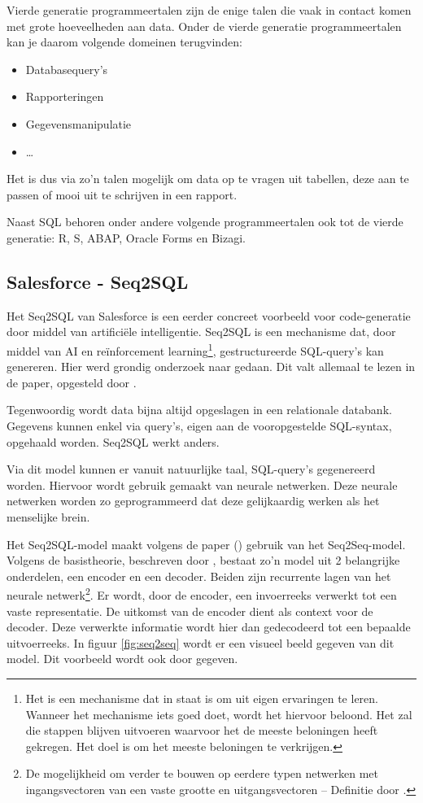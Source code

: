 Vierde generatie programmeertalen zijn de enige talen die vaak in contact komen met grote hoeveelheden aan data. Onder de vierde generatie programmeertalen kan je daarom volgende domeinen terugvinden:
\begin{itemize}
	\item Databasequery’s
	\item Rapporteringen
	\item Gegevensmanipulatie
	\item \dots
\end{itemize}

Het is dus via zo’n talen mogelijk om data op te vragen uit tabellen, deze aan te passen of mooi uit te schrijven in een rapport.

Naast SQL behoren onder andere volgende programmeertalen ook tot de vierde generatie: R, S, ABAP, Oracle Forms en Bizagi.

\subsection{Salesforce - Seq2SQL}
\label{sec:Salesforce - Seq2SQL}

Het Seq2SQL van Salesforce is een eerder concreet voorbeeld voor code-generatie door middel van artificiële intelligentie. Seq2SQL is een mechanisme dat, door middel van AI en reïnforcement learning\footnote{Het is een mechanisme dat in staat is om uit eigen ervaringen te leren. Wanneer het mechanisme iets goed doet, wordt het hiervoor beloond. Het zal die stappen blijven uitvoeren waarvoor het de meeste beloningen heeft gekregen. Het doel is om het meeste beloningen te verkrijgen.}, gestructureerde SQL-query’s kan genereren. Hier werd grondig onderzoek naar gedaan. Dit valt allemaal te lezen in de paper, opgesteld door \textcite{seq2sqlPaper}.

Tegenwoordig wordt data bijna altijd opgeslagen in een relationale databank. Gegevens kunnen enkel via query’s, eigen aan de vooropgestelde SQL-syntax, opgehaald worden. Seq2SQL werkt anders.

Via dit model kunnen er vanuit natuurlijke taal, SQL-query’s gegenereerd worden. Hiervoor wordt gebruik gemaakt van neurale netwerken. Deze neurale netwerken worden zo geprogrammeerd dat deze gelijkaardig werken als het menselijke brein. 

Het Seq2SQL-model maakt volgens de paper (\textcite{seq2sqlPaper}) gebruik van het Seq2Seq-model. Volgens de basistheorie, beschreven door \textcite{drnn}, bestaat zo’n model uit 2 belangrijke onderdelen, een encoder en een decoder. Beiden zijn recurrente lagen van het neurale netwerk\footnote{De mogelijkheid om verder te bouwen op eerdere typen netwerken met ingangsvectoren van een vaste grootte en uitgangsvectoren – Definitie door \textcite{rnn}.}. Er wordt, door de encoder, een invoerreeks verwerkt tot een vaste representatie. De uitkomst van de encoder dient als context voor de decoder. Deze verwerkte informatie wordt hier dan gedecodeerd tot een bepaalde uitvoerreeks. In figuur \ref{fig:seq2seq} wordt er een visueel beeld gegeven van dit model. Dit voorbeeld wordt ook door \textcite{drnn} gegeven.

